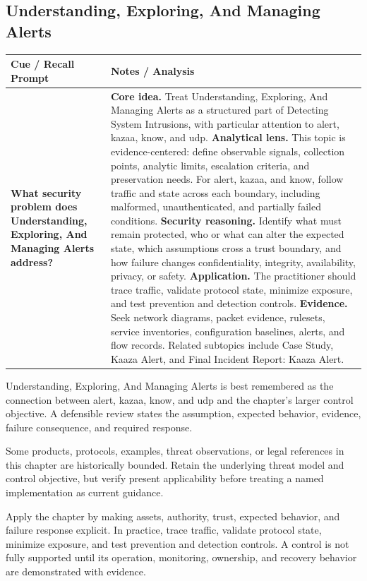 \documentclass[11pt]{article}
\newcommand{\CornellHeader}{%
\rowcolor{Navy}\color{white}\bfseries Cue / Recall Prompt & \color{white}\bfseries Notes / Analysis\\\hline}
\newcommand{\CornellRow}[2]{%
\cellcolor{CueGray}\RaggedRight\textbf{#1} & \RaggedRight #2\\\hline}
\begin{document}
\subsection*{Understanding, Exploring, And Managing Alerts}
\begin{longtable}{>{\RaggedRight\arraybackslash}p{}|>{\RaggedRight\arraybackslash}p{}}
\CornellHeader
\CornellRow{What security problem does Understanding, Exploring, And Managing Alerts address?}{\textbf{Core idea.} Treat Understanding, Exploring, And Managing Alerts as a structured part of Detecting System Intrusions, with particular attention to alert, kazaa, know, and udp. \textbf{Analytical lens.} This topic is evidence-centered: define observable signals, collection points, analytic limits, escalation criteria, and preservation needs. For alert, kazaa, and know, follow traffic and state across each boundary, including malformed, unauthenticated, and partially failed conditions. \textbf{Security reasoning.} Identify what must remain protected, who or what can alter the expected state, which assumptions cross a trust boundary, and how failure changes confidentiality, integrity, availability, privacy, or safety. \textbf{Application.} The practitioner should trace traffic, validate protocol state, minimize exposure, and test prevention and detection controls. \textbf{Evidence.} Seek network diagrams, packet evidence, rulesets, service inventories, configuration baselines, alerts, and flow records. Related subtopics include Case Study, Kaaza Alert, and Final Incident Report: Kaaza Alert.}
\end{longtable}
\begin{topicsummary}
Understanding, Exploring, And Managing Alerts is best remembered as the connection between alert, kazaa, know, and udp and the chapter's larger control objective. A defensible review states the assumption, expected behavior, evidence, failure consequence, and required response.
\end{topicsummary}
\begin{historybox}
Some products, protocols, examples, threat observations, or legal references in this chapter are historically bounded. Retain the underlying threat model and control objective, but verify present applicability before treating a named implementation as current guidance.
\end{historybox}
\begin{defensebox}
Apply the chapter by making assets, authority, trust, expected behavior, and failure response explicit. In practice, trace traffic, validate protocol state, minimize exposure, and test prevention and detection controls. A control is not fully supported until its operation, monitoring, ownership, and recovery behavior are demonstrated with evidence.
\end{defensebox}
\end{document}

